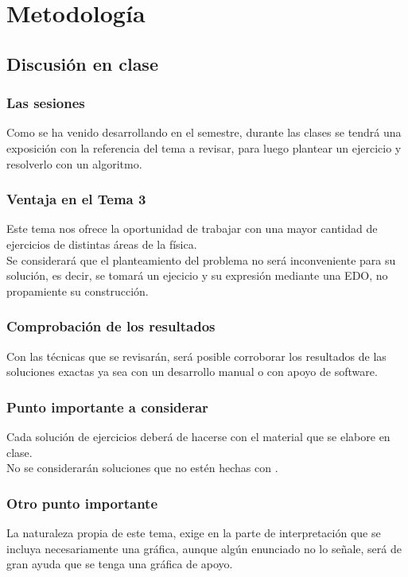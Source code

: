 \documentclass[12pt]{beamer}
\begin{document}
\section{Metodología}
\subsection{Discusión en clase}

\begin{frame}
\frametitle{Las sesiones}
Como se ha venido desarrollando en el semestre, durante las clases se tendrá una exposición con la referencia del tema a revisar, para luego plantear un ejercicio y resolverlo con un algoritmo.
\end{frame}
\begin{frame}
\frametitle{Ventaja en el Tema 3}
Este tema nos ofrece la oportunidad de trabajar con una mayor cantidad de ejercicios de distintas áreas de la física.
\\
\bigskip
\pause
Se considerará que el planteamiento del problema no será inconveniente para su solución, es decir, se tomará un ejecicio y su expresión mediante una EDO, no propamiente su construcción.
\end{frame}
\begin{frame}
\frametitle{Comprobación de los resultados}
Con las técnicas que se revisarán, será posible corroborar los resultados de las soluciones exactas ya sea con un desarrollo manual o con apoyo de software.
\end{frame}
\begin{frame}
\frametitle{Punto importante a considerar}
Cada solución de ejercicios deberá de hacerse con el material que se elabore en clase.
\\
\bigskip
\pause
No se considerarán soluciones que no estén hechas con \python.
\end{frame}
\begin{frame}
\frametitle{Otro punto importante}
La naturaleza propia de este tema, exige en la parte de interpretación que se incluya necesariamente una gráfica, aunque algún enunciado no lo señale, será de gran ayuda que se tenga una gráfica de apoyo.
\end{frame}

\end{document}
